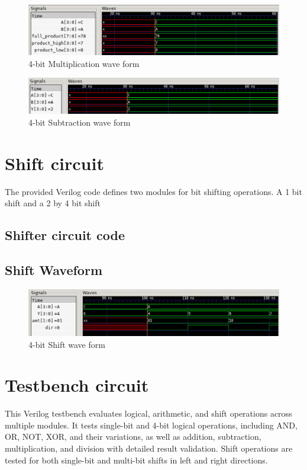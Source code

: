 \documentclass[12pt]{article}
\begin{document}
\begin{figure}[H]
    \centering 
    \includegraphics[width = 1.0\textwidth]{pictures/4bitMultiplication.PNG}
    \caption{4-bit Multiplication wave form}
    \label{fig:enter-label}
    \end{figure}   

\begin{figure}[H]
    \centering 
    \includegraphics[width = 1.0\textwidth]{pictures/4bitSubtraction.PNG}
    \caption{4-bit Subtraction wave form}
    \label{fig:enter-label}
    \end{figure} 

\section{Shift circuit}
The provided Verilog code defines two modules for bit shifting operations. A 1 bit shift and a 2 by 4 bit shift
\subsection{Shifter circuit code}


\subsection{Shift Waveform}
\begin{figure}[H]
    \centering 
   \includegraphics[width = 1.0\textwidth]{pictures/4bitShift.PNG}
    \caption{4-bit Shift wave form}
    \label{fig:enter-label}
    \end{figure}

\section{Testbench circuit}
This Verilog testbench evaluates logical, arithmetic, and shift operations across multiple modules. It tests single-bit and 4-bit logical operations, including AND, OR, NOT, XOR, and their variations, as well as addition, subtraction, multiplication, and division with detailed result validation. Shift operations are tested for both single-bit and multi-bit shifts in left and right directions.
\end{document}
